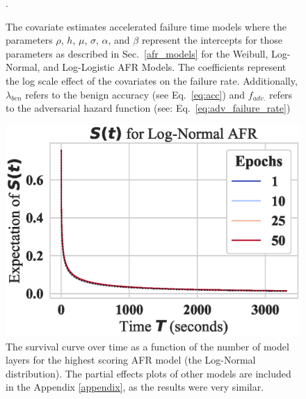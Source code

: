 \begin{figure}
\begin{subfigure}{0.32\textwidth}
	\end{subfigure}

	\caption{The covariate estimates accelerated failure time models where the parameters $\rho$, $h$, $\mu$, $\sigma$, $\alpha$, and $\beta$ represent the intercepts for those parameters as described in Sec.~\ref{afr_models} for the Weibull, Log-Normal, and Log-Logistic AFR Models. The coefficients represent the log scale effect of the covariates on the failure rate. Additionally, $\lambda_{ben}$ refers to the benign accuracy (see Eq.~\ref{eq:acc}) and $f_{adv.}$ refers to the adversarial hazard function (see: Eq.~\ref{eq:adv_failure_rate})}.
	\label{fig:afr_models}
\end{figure}

% 
\begin{figure}
	\centering\includegraphics[width=.5\textwidth]{cifar100_log_normal_epochs_partial_effect.eps}
	\caption{The survival curve over time as a function of the number of model layers for the highest scoring AFR model (the Log-Normal distribution). The partial effects plots of other models are included in the Appendix \ref{appendix}, as the results were very similar.}
	\label{fig:layers}
\end{figure}
% 


